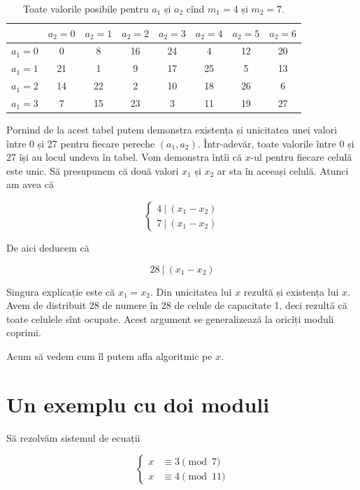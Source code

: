 \documentclass[../main.tex]{subfiles}
\begin{document}
\begin{table}[H]
  \centering
  \begin{tabular}{c|ccccccc}
    & $a_2 = 0$ & $a_2 = 1$ & $a_2 = 2$ & $a_2 = 3$ & $a_2 = 4$ & $a_2 = 5$ & $a_2 = 6$ \\
    \hline
    $a_1 = 0$ & 0 & 8 & 16 & 24 & 4 & 12 & 20 \\
    $a_1 = 1$ & 21 & 1 & 9 & 17 & 25 & 5 & 13 \\
    $a_1 = 2$ & 14 & 22 & 2 & 10 & 18 & 26 & 6 \\
    $a_1 = 3$ & 7 & 15 & 23 & 3 & 11 & 19 & 27 \\
    \hline
  \end{tabular}

  \caption{Toate valorile posibile pentru $a_1$ și $a_2$ cînd $m_1 = 4$ și $m_2 = 7$.}
\end{table}

Pornind de la acest tabel putem demonstra existența și unicitatea unei valori între 0 și 27 pentru fiecare pereche $(a_1, a_2)$. Într-adevăr, toate valorile între 0 și 27 își au locul undeva în tabel. Vom demonstra întîi că $x$-ul pentru fiecare celulă este unic. Să presupunem că două valori $x_1$ și $x_2$ ar sta în aceeași celulă. Atunci am avea că

$$
\begin{cases}
4 \ | \ (x_1 - x_2) \\
7 \ | \ (x_1 - x_2)
\end{cases}
$$

De aici deducem că

$$28 \ | \ (x_1 - x_2)$$

Singura explicație este că $x_1 = x_2$. Din unicitatea lui $x$ rezultă și existența lui $x$. Avem de distribuit 28 de numere în 28 de celule de capacitate 1, deci rezultă că toate celulele sînt ocupate. Acest argument se generalizează la oricîți moduli coprimi.

Acum să vedem cum îl putem afla algoritmic pe $x$.

\section{Un exemplu cu doi moduli}

Să rezolvăm sistemul de ecuații

$$
\begin{cases}
x &\equiv 3 \pmod{7}\\
x &\equiv 4 \pmod{11}
\end{cases}
$$
\end{document}
